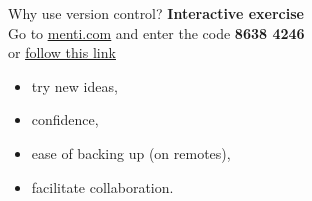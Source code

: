 \documentclass{beamer} %
\begin{document}
  \begin{frame}[label=GIT]{Why use version control?}
    \textbf{Interactive exercise}
    \\
    Go to \href{https://www.menti.com/}{\underline{menti.com}} and enter the code \textbf{8638 4246}
    \\
    or \href{https://www.menti.com/turid6cc7u}{\underline{follow this link}}
    \vspace{0.5cm}
    \pause
    \begin{itemize}
      \item try new ideas,
      \item confidence,
      \item ease of backing up (on remotes),
      \item facilitate collaboration.
    \end{itemize}
    
  \end{frame}
\end{document}
